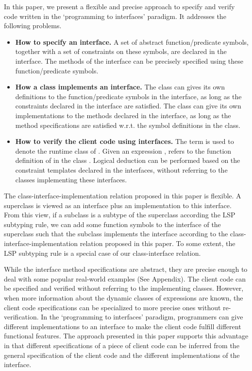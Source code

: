 \documentclass[fleqn]{llncs}
\begin{document}
In this paper, we present a flexible and precise approach to specify and verify code written in
 the `programming to interfaces' paradigm. It addresses the following problems.
\begin{itemize}
 \item \textbf{How to specify an interface.} A set of abstract function/predicate symbols, together with a set of constraints on these symbols, are declared in the interface. The methods of the interface can be precisely specified using these function/predicate symbols.
 \item \textbf{How a class implements an interface.} The class can gives its own definitions to the function/predicate symbols in the interface, as long as the constraints declared in the interface are satisfied.
     The class can give its own implementations to the methods declared in the interface, as long as the method specifications are satisfied w.r.t. the symbol definitions in the class.
\item \textbf{How to verify the client code using interfaces.} The term  is used to denote the runtime class of . Given an expression ,  refers to the function definition of  in the class . Logical deduction can be performed based on the constraint templates declared in the interfaces, without referring to the classes implementing these interfaces.
\end{itemize}
The class-interface-implementation relation proposed in this paper is flexible. A superclass is viewed as an interface plus an implementation to this interface.
From this view, if a subclass is a subtype of the superclass according the LSP subtyping rule, we can add some function symbols to the interface of the superclass such that
the subclass implements the interface according to the class-interface-implementation relation proposed in this paper. To some extent, the LSP subtyping rule is a special case of our class-interface relation.

While the interface method specifications are abstract, they are  precise enough to deal with some popular real-world examples (See Appendix). The client code can be specified and verified without referring to the implementing classes. However, when more information about the dynamic classes of expressions are known, the client code specifications can be specialized to more precise ones without re-verification. In the `programming to interfaces' paradigm, programmers can give different implementations to an interface to make the client code fulfill different functional features. The approach presented in this paper supports this advantage in that different specifications of a piece of client code can be inferred from the general specification of the client code and the different implementations of the interface.
\end{document}
